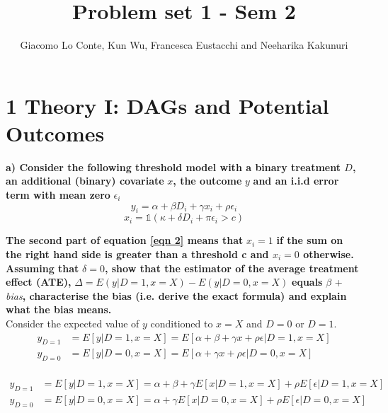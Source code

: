 \documentclass[a4paper,12pt,oneside,English]{article}
\title{Problem set 1 - Sem 2}
\author{ Giacomo Lo Conte, Kun Wu, Francesca Eustacchi and Neeharika Kakunuri }
\begin{document}
\maketitle
\section{ 1 Theory I: DAGs and Potential Outcomes}
\textbf{a) Consider the following threshold model with a binary treatment $D$, an additional (binary) covariate} $x$\textbf{, the outcome} $y$ \textbf{and an i.i.d error term with mean zero} $\epsilon_i$
\begin{equation}
    y_i = \alpha + \beta D_i + \gamma x_i + \rho \epsilon_i
\end{equation}
\begin{equation}
\label{eqn 2}
 x_i = \mathds{1}(\kappa + \delta D_i + \pi \epsilon_i > c) 
\end{equation}

\textbf{The second part of equation \ref{eqn 2} means that} $x_i = 1$ \textbf{if the sum on the right hand side is greater than a threshold c and $x_i = 0$ otherwise. Assuming that} $\delta = 0$\textbf{, show that the estimator of the average treatment effect (ATE), }$\Delta=E(y|D = 1 ,x = X) - E(y|D = 0 ,x = X)$ \textbf{equals}  $\beta$ + \textit{bias}\textbf{, characterise the bias (i.e. derive the exact formula)  and explain what the bias means.}\\

Consider the expected value of $y$ conditioned to $x=X$ and $D=0$ or $D=1$. 
\begin{equation}
\begin{split}
        y_{D=1}&=E[y|D=1, x=X]=E[\alpha+\beta+\gamma x + \rho \epsilon|D=1, x=X]\\
        y_{D=0}&=E[y|D=0, x=X]=E[\alpha+\gamma x + \rho \epsilon | D=0, x=X]\\
\end{split}
\end{equation}

\begin{equation}
\begin{split}
        y_{D=1}&=E[y|D=1, x=X]=\alpha+\beta+\gamma E[x|D=1, x=X] + \rho E[\epsilon|D=1, x=X]\\
        y_{D=0}&=E[y|D=0, x=X]=\alpha+\gamma E[x|D=0, x=X] + \rho E[\epsilon | D=0, x=X]\\
\end{split}
\end{equation}
\end{document}
